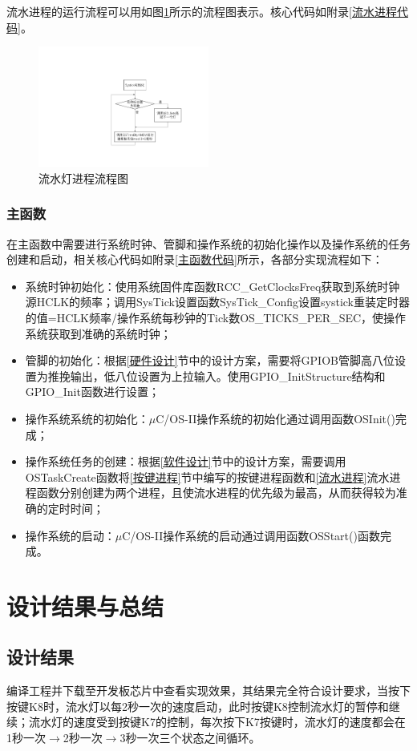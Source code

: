 \documentclass[a4paper]{ctexart}
\begin{document}
\begin{spacing}{1.3}
	流水进程的运行流程可以用如图\ref{fig:LED流程图}所示的流程图表示。核心代码如附录\ref{流水进程代码}。

	\begin{figure}[htbp]
		\centering
		\includegraphics[width=0.5\textwidth]{figure/LEDflow.pdf}
		\caption{流水灯进程流程图}\label{fig:LED流程图}
	\end{figure}

	\subsubsection{主函数}
	在主函数中需要进行系统时钟、管脚和操作系统的初始化操作以及操作系统的任务创建和启动，相关核心代码如附录\ref{主函数代码}所示，各部分实现流程如下：
	\begin{itemize}
		\item 系统时钟初始化：使用系统固件库函数RCC\_GetClocksFreq获取到系统时钟源HCLK的频率；调用SysTick设置函数SysTick\_Config设置systick重装定时器的值=HCLK频率/操作系统每秒钟的Tick数OS\_TICKS\_PER\_SEC，使操作系统获取到准确的系统时钟；
		\item 管脚的初始化：根据\ref{硬件设计}节中的设计方案，需要将GPIOB管脚高八位设置为推挽输出，低八位设置为上拉输入。使用GPIO\_InitStructure结构和GPIO\_Init函数进行设置；
		\item 操作系统系统的初始化：$\mu$C/OS-II操作系统的初始化通过调用函数OSInit()完成；
		\item 操作系统任务的创建：根据\ref{软件设计}节中的设计方案，需要调用OSTaskCreate函数将\ref{按键进程}节中编写的按键进程函数和\ref{流水进程}流水进程函数分别创建为两个进程，且使流水进程的优先级为最高，从而获得较为准确的定时时间；
		\item 操作系统的启动：$\mu$C/OS-II操作系统的启动通过调用函数OSStart()函数完成。
	\end{itemize}
	
	\section{设计结果与总结}
	\subsection{设计结果}
	编译工程并下载至开发板芯片中查看实现效果，其结果完全符合设计要求，当按下按键K8时，流水灯以每2秒一次的速度启动，此时按键K8控制流水灯的暂停和继续；流水灯的速度受到按键K7的控制，每次按下K7按键时，流水灯的速度都会在1秒一次$\rightarrow$2秒一次$\rightarrow$3秒一次三个状态之间循环。


\end{spacing}
\end{document}
